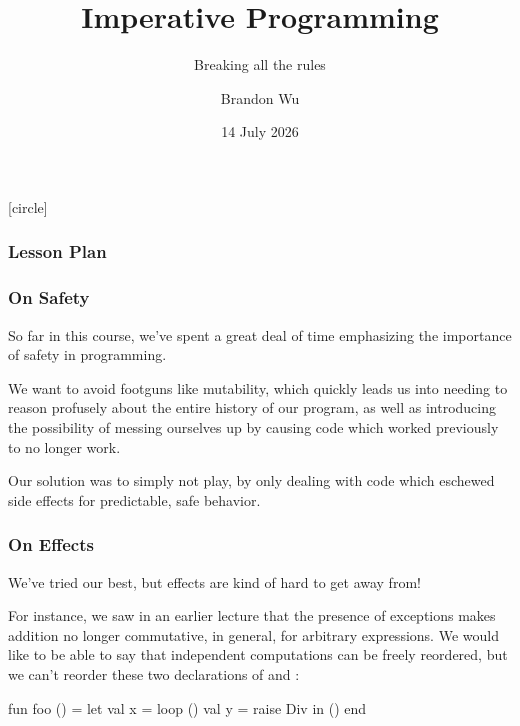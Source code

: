 \documentclass[aspectratio=169]{beamer}
\title{Imperative Programming} %
\subtitle{Breaking all the rules} %
\date{14 July 2026} %
\author{Brandon Wu} %
\newif\ifcolorlambda
\begin{document}
\ifweb
    \renewcommand{\pause}{}
\fi

[circle]

{
\begin{frame}[plain]
    \colorlambdatrue
    \titlepage
\end{frame}
}


\begin{frame}[fragile]
  \frametitle{Lesson Plan}

  \tableofcontents
\end{frame}


\begin{frame}[fragile]
  \frametitle{On Safety}

  So far in this course, we've spent a great deal of time emphasizing the
  importance of safety in programming.

  \pause
  \vspace{\fill}

  We want to avoid footguns like mutability, which quickly leads us into
  needing to reason profusely about the entire history of our program, as well as
  introducing the possibility of messing ourselves up by causing code which worked
  previously to no longer work.

  \pause
  \vspace{\fill}

  Our solution was to simply not play, by only dealing with  code
  which eschewed side effects for predictable, safe behavior.
\end{frame}

\begin{frame}[fragile]
  \frametitle{On Effects}

  We've tried our best, but effects are kind of hard to get away from!

  \pause
  \vspace{\fill}

  For instance, we saw in an earlier lecture that the presence of exceptions makes
  addition no longer commutative, in general, for arbitrary expressions. We would
  like to be able to say that independent computations can be freely reordered,
  but we can't reorder these two declarations of  and :

  \pause
  \vspace{\fill}

  \begin{codeblock}
    fun foo () =
      let
        val x = loop ()
        val y = raise Div
      in
        ()
      end
  \end{codeblock}
\end{frame}
\end{document}
